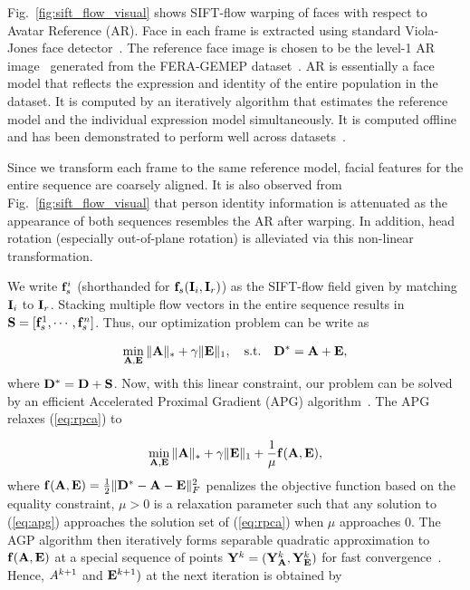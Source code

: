 \documentclass[journal]{IEEEtran}
\begin{document}
Fig.~\ref{fig:sift_flow_visual} shows SIFT-flow warping of faces with respect to Avatar Reference (AR). Face in each frame is extracted using standard Viola-Jones face detector~\cite{Viola_IJCV04}. The reference face image is chosen to be the level-1 AR image~\cite{Yang_SMCB12} generated from the FERA-GEMEP dataset~\cite{Valstar_FERA11}. AR is essentially a face model that reflects the expression and identity of the entire population in the dataset. It is computed by an iteratively algorithm that estimates the reference model and the individual expression model simultaneously. It is computed offline and has been demonstrated to perform well across datasets~\cite{Yang_SMCB12}. 

Since we transform each frame to the same reference model, facial features for the entire sequence are coarsely aligned. It is also observed from Fig.~\ref{fig:sift_flow_visual} that person identity information is attenuated as the appearance of both sequences resembles the AR after warping. In addition, head rotation (especially out-of-plane rotation) is alleviated via this non-linear transformation. 

We write ${\bf f}_s^i$ (shorthanded for ${\bf f}_s({\bf I}_i,{\bf I}_r)$) as the SIFT-flow field given by matching ${\bf I}_i$ to ${\bf I}_r$. Stacking multiple flow vectors in the entire sequence results in ${\bf S} = [{\bf f}_s^1, \cdots,{\bf f}_s^n]$. Thus, our optimization problem can be write as

\begin{equation} \label{eq:rpca}
\min_{\A,\E} \|\A\|_*+\gamma \|\E\|_1,  \quad \text{s.t.} \quad \D^* = \A + \E, 
\end{equation}
where ${\bf D}^*={\bf D}+{\bf S}$. Now, with this linear constraint, our problem can be solved by an efficient Accelerated Proximal Gradient (APG) algorithm~\cite{Beck09}. The APG relaxes (\ref{eq:rpca}) to

\begin{equation} \label{eq:apg}
\min_{\A,\E} \|\A\|_* + \gamma \|\E\|_1 + \frac{1}{\mu}\f(\A,\E),
\end{equation}
\noindent where ${\bf f}({\bf A},{\bf E})=\frac{1}{2}\|{\bf D}^*-{\bf A}-{\bf E}\|^2_F$ penalizes the objective function based on the equality constraint, $\mu>0$ is a relaxation parameter such that any solution to (\ref{eq:apg}) approaches the solution set of (\ref{eq:rpca}) when $\mu$ approaches 0. The AGP algorithm then iteratively forms separable quadratic approximation to ${\bf f}({\bf A},{\bf E})$ at a special sequence of points ${\bf Y}^k=({\bf Y}^k_{\bf A},{\bf Y}^k_{\bf E})$ for fast convergence~\cite{Beck09}. Hence, $\\A^{k+1}$ and ${\bf E}^{k+1})$ at the next iteration is obtained by
\end{document}
